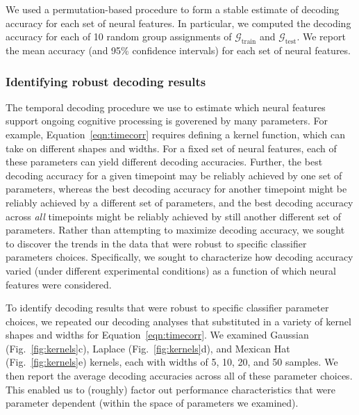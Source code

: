 \documentclass[english]{article}
\begin{document}
We used a permutation-based procedure to form a stable estimate of
decoding accuracy for each set of neural features.  In particular, we
computed the decoding accuracy for each of 10 random group assignments of
$\mathcal{G}_{\mathrm{train}}$ and $\mathcal{G}_{\mathrm{test}}$.  We
report the mean accuracy (and 95\% confidence intervals) for each set
of neural features.


\subsubsection*{Identifying robust decoding results}
The temporal decoding procedure we use to estimate which neural
features support ongoing cognitive processing is goverened by many
parameters.  For example, Equation~\ref{eqn:timecorr} requires
defining a kernel function, which can take on different shapes and
widths.  For a fixed set of neural features, each of these parameters
can yield different decoding accuracies.  Further, the best decoding
accuracy for a given timepoint may be reliably achieved by one set of
parameters, whereas the best decoding accuracy for another timepoint
might be reliably achieved by a different set of parameters, and the
best decoding accuracy across \textit{all} timepoints might be
reliably achieved by still another different set of parameters.
Rather than attempting to maximize decoding accuracy, we sought to
discover the trends in the data that were robust to specific
classifier parameters choices.  Specifically, we sought to
characterize how decoding accuracy varied (under different
experimental conditions) as a function of which neural features were
considered.

To identify decoding results that were robust to specific classifier
parameter choices, we repeated our decoding analyses that substituted
in a variety of kernel shapes and widths for
Equation~\ref{eqn:timecorr}.  We examined Gaussian
(Fig.~\ref{fig:kernels}c), Laplace (Fig.~\ref{fig:kernels}d), and
Mexican Hat (Fig.~\ref{fig:kernels}e) kernels, each with widths of 5,
10, 20, and 50 samples.  We then report the average decoding
accuracies across all of these parameter choices.  This enabled us to
(roughly) factor out performance characteristics that were parameter
dependent (within the space of parameters we examined).
\end{document}
